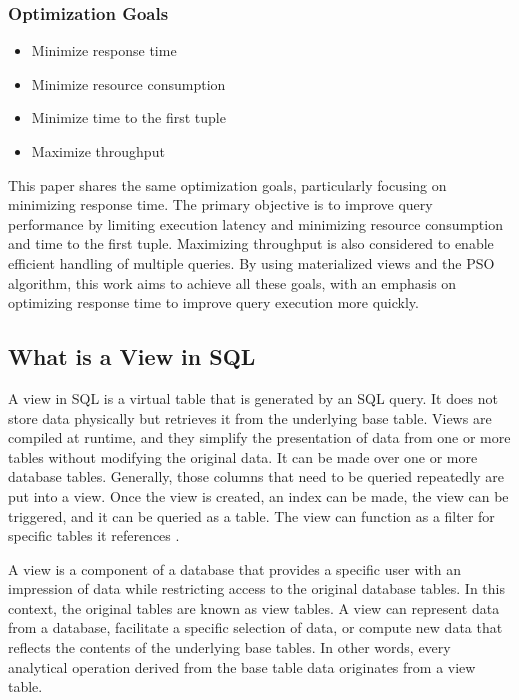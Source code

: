 \subsubsection*{Optimization Goals}

\begin{itemize}
    \item Minimize response time
    \item Minimize resource consumption
    \item Minimize time to the first tuple
    \item Maximize throughput
\end{itemize}\vspace{.4cm}

This paper shares the same optimization goals, particularly focusing on minimizing response time. The primary objective is to improve query performance by limiting execution latency and minimizing resource consumption and time to the first tuple. Maximizing throughput is also considered to enable efficient handling of multiple queries. By using materialized views and the PSO algorithm, this work aims to achieve all these goals, with an emphasis on optimizing response time to improve query execution more quickly.



\subsection{What is a View in SQL}
A view in SQL is a virtual table that is generated by an SQL query. It does not store data physically but retrieves it from the underlying base table. Views are compiled at runtime, and they simplify the presentation of data from one or more tables without modifying the original data. It can be made over one or more database tables. Generally, those columns that need to be queried repeatedly are put into a view. Once the view is created, an index can be made, the view can be triggered, and it can be queried as a table. The view can function as a filter for specific tables it references \cite{chauhan-2024, Rohan_Vats-2024}.\vspace{.4cm}

A view is a component of a database that provides a specific user with an impression of data while restricting access to the original database tables. In this context, the original tables are known as view tables. A view can represent data from a database, facilitate a specific selection of data, or compute new data that reflects the contents of the underlying base tables. In other words, every analytical operation derived from the base table data originates from a view table.\vspace{.4cm}




